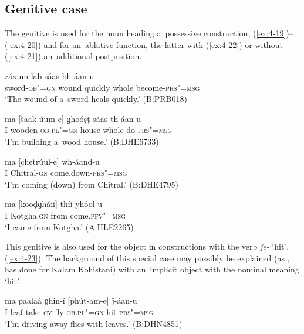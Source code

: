 \subsection{Genitive case}
\label{subsec:4-5-3}

The genitive is used for the noun heading a~possessive construction, (\ref{ex:4-19})--(\ref{ex:4-20}) and for an~ablative function, the latter with (\ref{ex:4-22}) or without (\ref{ex:4-21}) an~additional postposition.


\begin{exe}
\ex
\label{ex:4-19}
\gll [khanɡar-íi-e] záxum lab sáas bh-áan-u \\
	sword-\textsc{ob"=gn} wound quickly whole become-\textsc{prs"=msg} \\
\glt `The wound of a~sword heals quickly.' (B:PRB018)
\end{exe}

\begin{exe}
\ex
\label{ex:4-20}
\gll ma [\v{s}aak-úum-e] ɡhoóṣṭ sáas th-áan-u \\
	I wooden-\textsc{ob.pl"=gn} house whole do-\textsc{prs"=msg} \\
\glt `I'm building a~wood house.' (B:DHE6733)
\end{exe}

\begin{exe}
\ex
\label{ex:4-21}
\gll ma [c̣hetrúul-e] wh-áand-u \\
	I Chitral-\textsc{gn} come.down-\textsc{prs"=msg} \\
\glt `I'm coming (down) from Chitral.' (B:DHE4795)
\end{exe}

\begin{exe}
\ex
\label{ex:4-22}
\gll ma [kooḍɡháii] thíi yhóol-u \\
	I Kotgha.\textsc{gn} from come.\textsc{pfv"=msg} \\
\glt `I came from Kotgha.' (A:HLE2265)
\end{exe}

This genitive is also used for the object in constructions with the verb \textit{ǰe-} `hit', (\ref{ex:4-23}). The background of this special case may possibly be explained (as \citealt[43]{baart1999a}, has done for Kalam Kohistani) with an~implicit object with the nominal meaning `hit'.

\begin{exe}
\ex
\label{ex:4-23}
\gll ma paalaá ɡhin-í [phút-am-e] ǰ-áan-u \\
	I leaf take-\textsc{cv} fly-\textsc{ob.pl"=gn} hit-\textsc{prs"=msg} \\
\glt `I'm driving away flies with leaves.' (B:DHN4851)
\end{exe}

